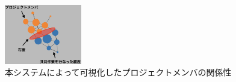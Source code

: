 \begin{figure}[h]
  \centering
  \includegraphics[width=0.3\textwidth]{img/cop-map.eps}
  \caption{本システムによって可視化したプロジェクトメンバの関係性}
  \label{cop-map-graph}
\end{figure}
